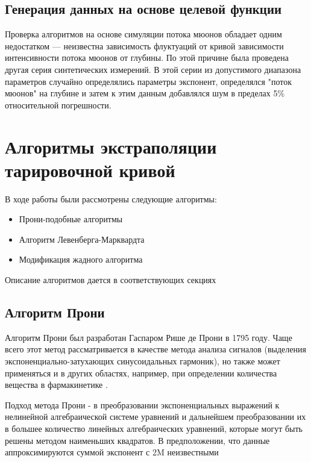 \subsection{Генерация данных на основе целевой функции}\label{subsect2_3_2}


Проверка алгоритмов на основе симуляции потока мюонов обладает 
одним недостатком --- неизвестна зависимость флуктуаций от  
кривой зависимости интенсивности 
потока мюонов от глубины. По этой причине была проведена другая серия 
синтетических измерений. В этой серии из допустимого диапазона 
параметров случайно определялись параметры 
экспонент, определялся "поток мюонов" на глубине и затем к этим 
данным добавлялся шум в пределах 5\% относительной погрешности.



\section{Алгоритмы экстраполяции тарировочной кривой}\label{sect2_4}

В ходе работы были рассмотрены следующие алгоритмы:

\begin{itemize}
 \item Прони-подобные алгоритмы
 \item Алгоритм Левенберга-Марквардта
 \item Модификация жадного алгоритма
 
\end{itemize}

Описание алгоритмов дается в соответствующих секциях

\subsection{Алгоритм Прони}\label{subsect2_4_1}

Алгоритм Прони был разработан Гаспаром Рише де Прони в 1795 году. Чаще всего этот метод рассматривается в 
качестве метода анализа сигналов (выделения экспоненциально-затухающих
синусоидальных гармоник), но также может применяться и в других областях, например, при определении количества 
вещества в фармакинетике \cite{pharmakinetics}.

Подход метода Прони - в преобразовании экспоненциальных выражений к нелинейной алгебраической системе уравнений и 
дальнейшем преобразовании их в большее количество линейных алгебраических уравнений, которые могут быть решены 
методом наименьших квадратов. В предположении, что данные аппроксимируются суммой экспонент с 2M неизвестными

